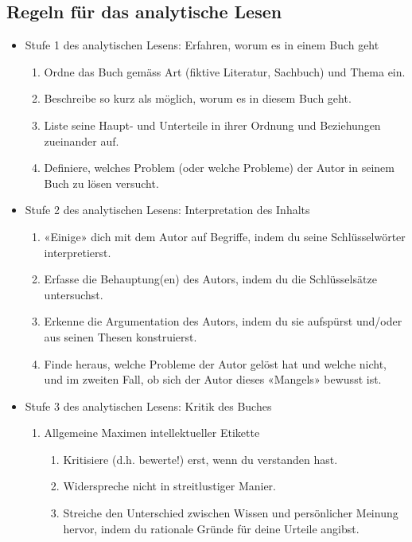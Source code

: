 \documentclass[a4paper,11pt]{scrartcl}
\begin{document}
\subsection*{Regeln für das analytische Lesen}

\begin{itemize}
    \item Stufe 1 des analytischen Lesens: Erfahren, worum es in einem Buch geht
    \begin{enumerate}
        \item Ordne das Buch gemäss Art (fiktive Literatur, Sachbuch) und Thema ein.
        \item Beschreibe so kurz als möglich, worum es in diesem Buch geht.
        \item Liste seine Haupt- und Unterteile in ihrer Ordnung und Beziehungen zueinander auf.
        \item Definiere, welches Problem (oder welche Probleme) der Autor in seinem Buch zu lösen versucht.
    \end{enumerate}
    \item Stufe 2 des analytischen Lesens: Interpretation des Inhalts
    \begin{enumerate}
        \item «Einige» dich mit dem Autor auf Begriffe, indem du seine Schlüsselwörter interpretierst.
        \item Erfasse die Behauptung(en) des Autors, indem du die Schlüsselsätze untersuchst.
        \item Erkenne die Argumentation des Autors, indem du sie aufspürst und/oder aus seinen Thesen konstruierst.
        \item Finde heraus, welche Probleme der Autor gelöst hat und welche nicht, und im zweiten Fall, ob sich der Autor dieses «Mangels» bewusst ist.
    \end{enumerate}
    \item Stufe 3 des analytischen Lesens: Kritik des Buches
    \begin{enumerate}
        \item Allgemeine Maximen intellektueller Etikette
        \begin{enumerate}
            \item Kritisiere (d.h. bewerte!) erst, wenn du verstanden hast.
            \item Widerspreche nicht in streitlustiger Manier.
            \item Streiche den Unterschied zwischen Wissen und persönlicher Meinung hervor, indem du rationale Gründe für deine Urteile angibst.

\end{enumerate}
\end{enumerate}
\end{itemize}
\end{document}
